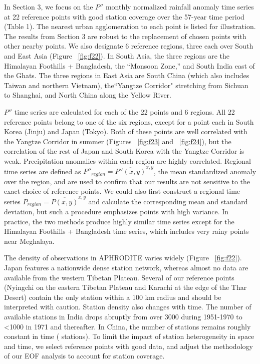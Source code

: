 	In Section 3, we focus on the $P''$ monthly normalized rainfall anomaly time series at 22 reference points with good station coverage over the 57-year time period (Table 1). The nearest urban agglomeration to each point is listed for illustration. The results from Section 3 are robust to the replacement of chosen points with other nearby points. We also designate 6 reference regions, three each over South and East Asia (Figure ~\ref{fig:f22}). In South Asia, the three regions are the Himalayan Foothills + Bangladesh, the ``Monsoon Zone,'' and South India east of the Ghats. The three regions in East Asia are South China (which also includes Taiwan and northern Vietnam), the``Yangtze Corridor" stretching from Sichuan to Shanghai, and North China along the Yellow River. 
	
	$P''$ time series are calculated for each of the 22 points and 6 regions. All 22 reference points belong to one of the six regions, except for a point each in South Korea (Jinju) and Japan (Tokyo). Both of these points are well correlated with the Yangtze Corridor in summer (Figures ~\ref{fig:f23} and ~\ref{fig:f24}), but the correlation of the rest of Japan and South Korea with the Yangtze Corridor is weak. Precipitation anomalies within each region are highly correlated. Regional time series are defined as $P''_{region}=\overline{P''(x,y)}^{x,y}$, the mean standardized anomaly over the region, and are used to confirm that our results are not sensitive to the exact choice of reference points. We could also first construct a regional time series $P_{region}=\overline{P(x,y)}^{x,y}$ and calculate the corresponding mean and standard deviation, but such a procedure emphasizes points with high variance. In practice, the two methods produce highly similar time series except for the Himalayan Foothills + Bangladesh time series, which includes very rainy points near Meghalaya. 
	
	The density of observations in APHRODITE varies widely (Figure ~\ref{fig:f22}). Japan features a nationwide dense station network, whereas almost no data are available from the western Tibetan Plateau. Several of our reference points (Nyingchi on the eastern Tibetan Plateau and Karachi at the edge of the Thar Desert) contain the only station within a 100 km radius and should be interpreted with caution. Station density also changes with time. The number of available stations in India drops abruptly from over 3000 during 1951-1970 to \textless1000 in 1971 and thereafter. In China, the number of stations remains roughly constant in time ( stations). To limit the impact of station heterogeneity in space and time, we select reference points with good data, and adjust the methodology of our EOF analysis to account for station coverage.
	
